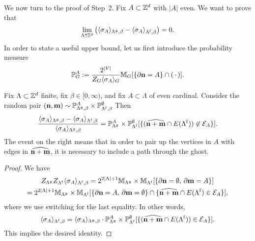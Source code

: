 We now turn to the proof of Step~2. Fix $A\subset\mathbb Z^d$
with $|A|$ even.
We want to prove that
\begin{equation}
    \label{eq:continuity_target_limit}
    \lim_{\Lambda\uparrow\Z^d}
    \left(
    \langle\sigma_A\rangle_{\Lambda^\frakg,\beta}
    -\langle\sigma_A\rangle_{\Lambda^\f,\beta}
    \right)
    =
    0.
\end{equation}
In order to state a useful upper bound,
let us first introduce the probability measure
\[
    \mathbb P_{G}^A:=\frac{2^{|V|}}{Z_G \langle\sigma_A\rangle_G} \mathbb M_G[\{\partial\mathbf{n}=A\}\cap(\,\cdot\,)].
\]

\begin{lemma}
    Fix $\Lambda\subset\mathbb Z^d$ finite, fix $\beta\in[0,\infty)$,
    and fix $A\subset\Lambda$ of even cardinal.
    Consider the random pair $(\mathbf{n},\mathbf{m})\sim \mathbb P_{\Lambda^\mathfrak g,\beta}^A\times\mathbb P_{\Lambda^{\operatorname{f}},\beta}^\emptyset$
    Then
    \begin{equation}
        \frac{
            \langle\sigma_A\rangle_{\Lambda^\mathfrak g,\beta}
            -\langle\sigma_A\rangle_{\Lambda^{\operatorname{f}},\beta}
        }{
            \langle\sigma_A\rangle_{\Lambda^\mathfrak g,\beta}
        }
        =
        \mathbb P_{\Lambda^\mathfrak g}^A\times\mathbb P_{\Lambda^{\operatorname{f}}}^\emptyset
        [\{(\widehat{\mathbf{n}+\mathbf{m}}\cap E(\Lambda^{\operatorname{f}}))\not\in\mathcal E_A\}].
    \end{equation}
    The event on the right means that in order to pair up the vertices in $A$
    with edges in $\widehat{\mathbf{n}+\mathbf{m}}$,
    it is necessary to include a path through the ghost.
\end{lemma}

\begin{proof}
    We have
    \begin{multline}
        Z_{\Lambda^\mathfrak g}Z_{\Lambda^{\operatorname{f}}}\langle\sigma_A\rangle_{\Lambda^{\operatorname{f}},\beta}=
        2^{2|\Lambda|+1}\mathbb M_{\Lambda^\mathfrak g}\times\mathbb M_{\Lambda^{\operatorname{f}}}[\{\partial\mathbf{n}=\emptyset,\,\partial\mathbf{m}= A\}]
        \\
        =
        2^{2|\Lambda|+1}\mathbb M_{\Lambda^\mathfrak g}\times\mathbb M_{\Lambda^{\operatorname{f}}}[\{\partial\mathbf{n}=A,\,\partial\mathbf{m}= \emptyset\}\cap\{\widehat{\mathbf{n}+\mathbf{m}}\cap E(\Lambda^{\operatorname{f}})\in\mathcal E_A\}],
    \end{multline}
    where we use switching for the last equality.
    In other words,
    \[
        \langle\sigma_A\rangle_{\Lambda^{\operatorname{f}},\beta}=
        \langle\sigma_A\rangle_{\Lambda^\mathfrak g,\beta}\cdot
        \mathbb P_{\Lambda^\mathfrak g}^A\times\mathbb P_{\Lambda^{\operatorname{f}}}^\emptyset
        [\{(\widehat{\mathbf{n}+\mathbf{m}}\cap E(\Lambda^{\operatorname{f}}))\in\mathcal E_A\}].
    \]
    This implies the desired identity.
\end{proof}

